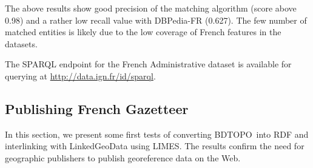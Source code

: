 The above results show good precision of the matching algorithm (score above 0.98) and a rather low recall value with DBPedia-FR (0.627). The few number of matched entities is likely due to the low coverage of French features  in the datasets. 


\begin{table}[!htbp]
\end{table}

The SPARQL endpoint for the French Administrative dataset is available for querying at \url{http://data.ign.fr/id/sparql}.




\subsection{Publishing  French Gazetteer} \label{sec:bdtopo}

In this section, we present some first tests of converting BDTOPO\circledR ~into RDF and interlinking with LinkedGeoData using LIMES. The results confirm the need for geographic publishers to publish georeference data on the Web. 

